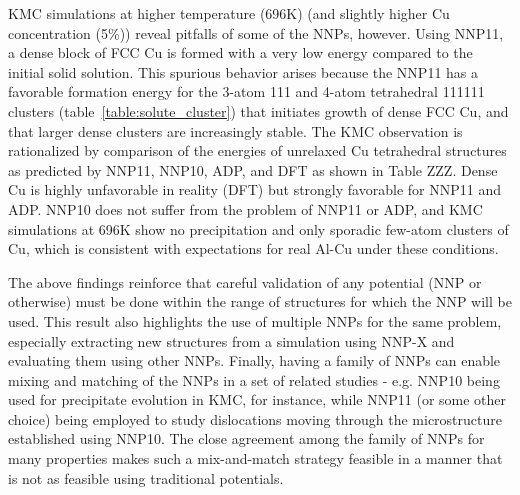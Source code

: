 \documentclass{article}
\begin{document}
KMC simulations at higher temperature (696K) (and slightly higher Cu concentration (5\%)) reveal pitfalls of some of the NNPs, however.  Using NNP11, a dense block of FCC Cu is formed with a very low energy compared to the initial solid solution.  This spurious behavior arises because the NNP11 has a favorable formation energy for the 3-atom 111 and 4-atom tetrahedral 111111 clusters (table~\ref{table:solute_cluster}) that initiates growth of dense FCC Cu, and that larger dense clusters are increasingly stable.  The KMC observation is rationalized by comparison of the energies of unrelaxed Cu tetrahedral structures as predicted by NNP11, NNP10, ADP, and DFT as shown in Table ZZZ. Dense Cu is highly unfavorable in reality (DFT) but strongly favorable for NNP11 and ADP.  NNP10 does not suffer from the problem of NNP11 or ADP, and KMC simulations at 696K show no precipitation and only sporadic few-atom clusters of Cu, which is consistent with expectations for real Al-Cu under these conditions.  

The above findings reinforce that careful validation of any potential (NNP or otherwise) must be done within the range of structures for which the NNP will be used.  This result also highlights the use of multiple NNPs for the same problem, especially extracting new structures from a simulation using NNP-X and evaluating them using other NNPs.  Finally, having a family of NNPs can enable mixing and matching of the NNPs in a set of related studies - e.g. NNP10 being used for precipitate evolution in KMC, for instance, while NNP11 (or some other choice) being employed to study dislocations moving through the microstructure established using NNP10.  The close agreement among the family of NNPs for many properties makes such a mix-and-match strategy feasible in a manner that is not as feasible using traditional potentials.
\end{document}
